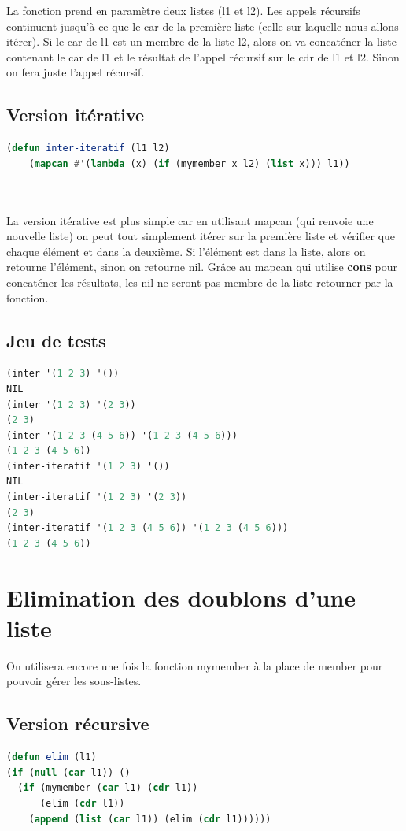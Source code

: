 \documentclass[a4paper,10pt]{report}
\begin{document}
      La fonction prend en paramètre deux listes (l1 et l2). Les appels récursifs continuent jusqu'à ce que le car de la première liste (celle sur laquelle nous allons itérer).
      Si le car de l1 est un membre de la liste l2, alors on va concaténer la liste contenant le car de l1 et le résultat de l'appel récursif sur le cdr de l1 et l2. Sinon
      on fera juste l'appel récursif. \newline
      
      
      \subsection{Version itérative}
      
	\begin{lstlisting}[language=Lisp]
(defun inter-iteratif (l1 l2)
    (mapcan #'(lambda (x) (if (mymember x l2) (list x))) l1))

    
    \end{lstlisting}

      La version itérative est plus simple car en utilisant mapcan (qui renvoie une nouvelle liste) on peut tout simplement itérer sur la première liste et vérifier que chaque élément et dans la deuxième.
      Si l'élément est dans la liste, alors on retourne l'élément, sinon on retourne nil. Grâce au mapcan qui utilise \textbf{cons} pour concaténer les résultats, les nil ne seront pas membre de la liste retourner par la fonction.
      \vspace{1cm}
	  \subsection{Jeu de tests}
	   \begin{lstlisting}[language=Lisp]
(inter '(1 2 3) '())
NIL	      
(inter '(1 2 3) '(2 3))
(2 3)	   
(inter '(1 2 3 (4 5 6)) '(1 2 3 (4 5 6)))
(1 2 3 (4 5 6))
(inter-iteratif '(1 2 3) '())
NIL	      
(inter-iteratif '(1 2 3) '(2 3))
(2 3)	   
(inter-iteratif '(1 2 3 (4 5 6)) '(1 2 3 (4 5 6)))
(1 2 3 (4 5 6))
		 \end{lstlisting}

      \section{Elimination des doublons d'une liste}
      On utilisera encore une fois la fonction mymember à la place de member pour pouvoir gérer les sous-listes.
      \subsection{Version récursive}
	\begin{lstlisting}[language=Lisp]
(defun elim (l1)
(if (null (car l1)) ()
  (if (mymember (car l1) (cdr l1))
      (elim (cdr l1))
    (append (list (car l1)) (elim (cdr l1))))))
	
	
	\end{lstlisting}
      
\end{document}
